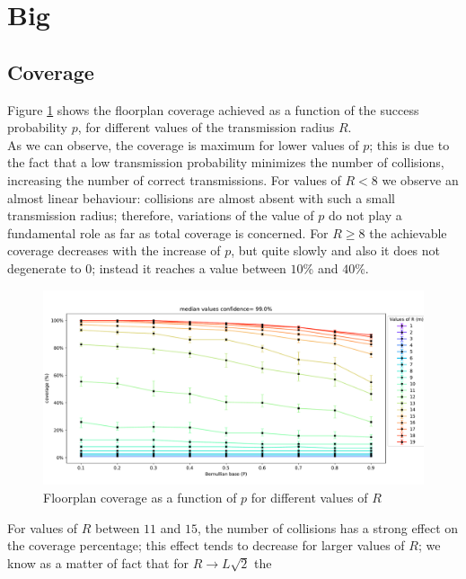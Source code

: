 \section{Big}\label{sec:big}
\subsection{Coverage}\label{ssec:coverage}
Figure \ref{fig:floorplancoverage1} shows the floorplan coverage achieved as a
function of the success probability $p$, for different values of
the transmission radius $R$. \\
As we can observe, the coverage is maximum
for lower values of $p$; this is due to the fact that a low transmission
probability minimizes the number of collisions, increasing the number of correct
transmissions. For values of $R < 8$ we observe an almost linear behaviour:
collisions are almost absent with such a small transmission radius; therefore,
variations of the value of $p$ do not play a fundamental role as far as total coverage is
concerned. For $R \geq 8$ the achievable coverage
decreases with the increase of $p$, but quite slowly and also it does not
degenerate to $0$; instead it reaches a value between $10$\% and $40$\%.
\begin{figure}[H]
    \begin{center}
        \includegraphics[scale=.42]{img/Big_CovP_median.pdf}
    \end{center}
    \vspace*{-0.5cm}
    \caption{Floorplan coverage as a function of $p$ for different values of $R$}
    \label{fig:floorplancoverage1}
\end{figure}
\noindent
For values of $R$ between $11$ and $15$, the number of collisions has a strong
effect on the coverage percentage; this effect tends to decrease for larger
values of $R$; we know as a matter of fact that for $R \to L\sqrt{2}$ the
